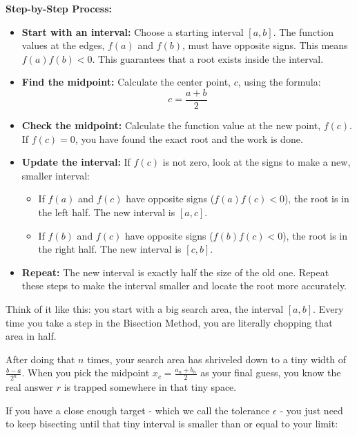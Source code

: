\documentclass{article}
\begin{document}
\newpage
\textbf{Step-by-Step Process:}
\begin{itemize}
    \item \textbf{Start with an interval:} Choose a starting interval $[a, b]$. The function values at the edges, $f(a)$ and $f(b)$, must have opposite signs. This means $f(a)f(b) < 0$. This guarantees that a root exists inside the interval.
    
    \item \textbf{Find the midpoint:} Calculate the center point, $c$, using the formula:
    \begin{equation*}
        c = \frac{a + b}{2}
    \end{equation*}
    
    \item \textbf{Check the midpoint:} Calculate the function value at the new point, $f(c)$. If $f(c) = 0$, you have found the exact root and the work is done.
    
    \item \textbf{Update the interval:} If $f(c)$ is not zero, look at the signs to make a new, smaller interval:
    \begin{itemize}
        \item If $f(a)$ and $f(c)$ have opposite signs ($f(a)f(c) < 0$), the root is in the left half. The new interval is $[a, c]$.
        \item If $f(b)$ and $f(c)$ have opposite signs ($f(b)f(c) < 0$), the root is in the right half. The new interval is $[c, b]$.
    \end{itemize}
    
    \item \textbf{Repeat:} The new interval is exactly half the size of the old one. Repeat these steps to make the interval smaller and locate the root more accurately.
\end{itemize}

Think of it like this: you start with a big search area, the interval $[a, b]$. Every time you take a step in the Bisection Method, you are literally chopping that area in half. 

After doing that $n$ times, your search area has shriveled down to a tiny width of $\frac{b - a}{2^n}$. When you pick the midpoint $x_c = \frac{a_n + b_n}{2}$ as your final guess, you know the real answer $r$ is trapped somewhere in that tiny space. 

If you have a close enough target - which we call the tolerance $\epsilon$ - you just need to keep bisecting until that tiny interval is smaller than or equal to your limit:
\end{document}
